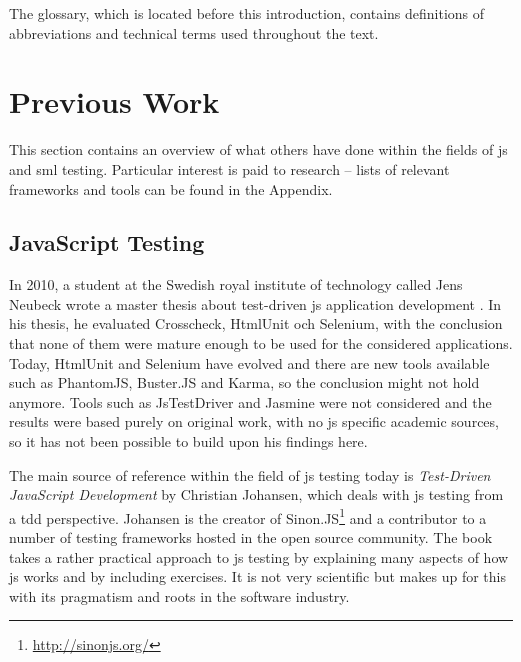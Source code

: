 \documentclass[11pt]{article}
\begin{document}
The glossary, which is located before this introduction, contains definitions of abbreviations and technical terms used throughout the text.

\section{Previous Work}
\label{sec:previouswork}

This section contains an overview of what others have done within the fields of \gls{js} and \gls{sml} testing. Particular interest is paid to research -- lists of relevant frameworks and tools can be found in the Appendix.

\subsection{JavaScript Testing}
\label{subsec:previousworkjs}

In 2010, a student at the Swedish royal institute of technology called Jens Neubeck wrote a master thesis about test-driven \gls{js} application development \cite{Neubeck}. In his thesis, he evaluated Crosscheck, HtmlUnit och Selenium, with the conclusion that none of them were mature enough to be used for the considered applications. Today, HtmlUnit and Selenium have evolved and there are new tools available such as PhantomJS, Buster.JS and Karma, so the conclusion might not hold anymore. Tools such as JsTestDriver and Jasmine were not considered and the results were based purely on original work, with no \gls{js} specific academic sources, so it has not been possible to build upon his findings here.

The main source of reference within the field of \gls{js} testing today is \emph{Test-Driven JavaScript Development} \cite{Tddjs} by Christian Johansen, which deals with \gls{js} testing from a \gls{tdd} perspective. Johansen is the creator of Sinon.JS\footnote{\url{http://sinonjs.org/}} and a contributor to a number of testing frameworks hosted in the open source community. The book takes a rather practical approach to \gls{js} testing by explaining many aspects of how \gls{js} works and by including exercises. It is not very scientific but makes up for this with its pragmatism and roots in the software industry.
\end{document}
